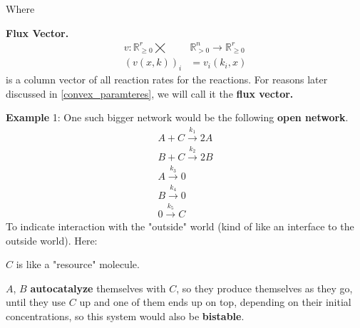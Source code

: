 Where
\begin{definition}\label{flux_vector}
	\textbf{Flux Vector.}
	\begin{align}
		v : \mathbb{R}^r_{\geq 0}  \bigtimes &\mathbb{R}^n_{> 0} \rightarrow \mathbb{R}^r_{\geq 0}  \nonumber \\
		(v(x,k))_{i} &= v_i(k_i, x)
	\end{align}
	is a column vector of all reaction rates for the reactions. For reasons later discussed in \ref{convex_paramteres}, we will call it the \textbf{flux vector.}
\end{definition}

\newpage
\textbf{Example}\label{bigger_network_example1} 1:
One such bigger network would be the following \textbf{open network}.
\begin{align*}
	A + C \xrightarrow{k_{1}} 2A \\
	B + C \xrightarrow{k_{2}} 2B  \\
	A \xrightarrow{k_{3}} 0 \\
	B \xrightarrow{k_{4}} 0 \\
	0 \xrightarrow{k_{5}} C
\end{align*}
To indicate interaction with the "outside" world (kind of like an interface to the outside world).
Here: 	

$C$ is like a "resource" molecule.

$A$, $B$ \textbf{autocatalyze} themselves with $C$, so they produce themselves as they go, until they use $C$ up and one of them ends up on top, depending on their initial concentrations, so this system would also be \textbf{bistable}.


